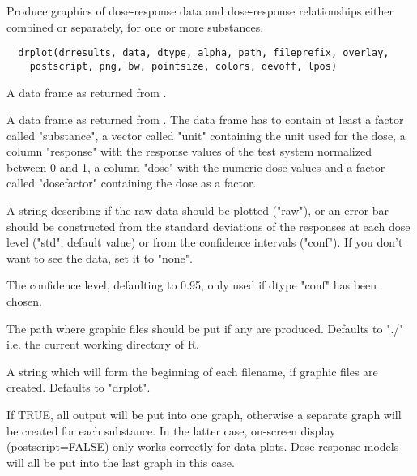 \begin{Description}\relax
Produce graphics of dose-response data and dose-response relationships 
either combined or separately, for one or more substances.
\end{Description}
\begin{Usage}
\begin{verbatim}
  drplot(drresults, data, dtype, alpha, path, fileprefix, overlay,
    postscript, png, bw, pointsize, colors, devoff, lpos)
\end{verbatim}
\end{Usage}
\begin{Arguments}
\begin{ldescription}
\item[\code{drresults}] A data frame as returned from .

\item[\code{data}] A data frame as returned from . The data frame has to
contain at least a factor called "substance", a vector called "unit"
containing the unit used for the dose, a column "response" with the
response values of the test system normalized between 0 and 1, a column
"dose" with the numeric dose values and a factor called "dosefactor"
containing the dose as a factor. 

\item[\code{dtype}] A string describing if the raw data should be plotted ("raw"), or an error
bar should be constructed from the standard deviations of the responses at
each dose level ("std", default value) or from the confidence intervals
("conf"). If you don't want to see the data, set it to "none".

\item[\code{alpha}] The confidence level, defaulting to 0.95, only used if dtype "conf" has been
chosen.

\item[\code{path}] The path where graphic files should be put if any are produced. Defaults
to "./" i.e. the current working directory of R.

\item[\code{fileprefix}] A string which will form the beginning of each filename, if graphic files are 
created. Defaults to "drplot".

\item[\code{overlay}] If TRUE, all output will be put into one graph, otherwise a separate graph
will be created for each substance. In the latter case, on-screen display
(postscript=FALSE) only works correctly for data plots. Dose-response models
will all be put into the last graph in this case.


\end{ldescription}
\end{Arguments}
